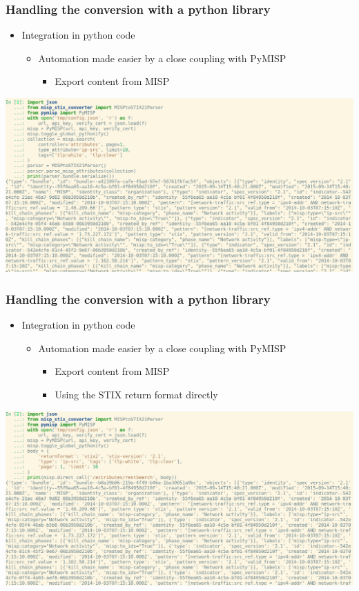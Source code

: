 \begin{frame}
    \frametitle{Handling the conversion with a python library}
    \begin{itemize}
        \item Integration in python code
        \begin{itemize}
            \item Automation made easier by a close coupling with PyMISP
            \begin{itemize}
                \item Export content from MISP
            \end{itemize}
        \end{itemize}
    \end{itemize}
    \includegraphics[scale=0.15]{images/PyMISPrestSearchMISP.png}
\end{frame}

\begin{frame}
    \frametitle{Handling the conversion with a python library}
    \begin{itemize}
        \item Integration in python code
        \begin{itemize}
            \item Automation made easier by a close coupling with PyMISP
            \begin{itemize}
                \item Export content from MISP
                \item Using the STIX return format directly
            \end{itemize}
        \end{itemize}
    \end{itemize}
    \includegraphics[scale=0.15]{images/PyMISPrestSearchSTIX.png}
\end{frame}

